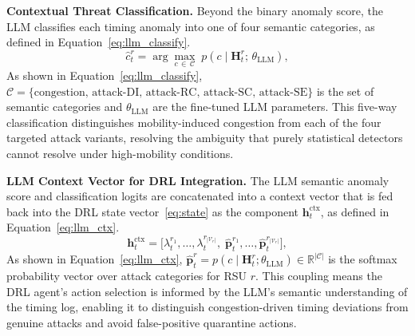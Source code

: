 \textbf{Contextual Threat Classification.}
Beyond the binary anomaly score, the LLM classifies each timing anomaly into one of four
semantic categories, as defined in
Equation~\eqref{eq:llm_classify}.
\begin{equation}
\hat{c}_t^r = \arg\max_{c\,\in\,\mathcal{C}}
  \;p\!\left(c \mid \mathbf{H}_t^r;\,\theta_{\mathrm{LLM}}\right),
\label{eq:llm_classify}
\end{equation}
As shown in Equation~\eqref{eq:llm_classify}, $\mathcal{C} =
\{\mathrm{congestion},\, \mathrm{attack\text{-}DI},\,
\mathrm{attack\text{-}RC},\, \mathrm{attack\text{-}SC},\,
\mathrm{attack\text{-}SE}\}$ is the set of semantic categories
and $\theta_{\mathrm{LLM}}$ are the fine-tuned LLM parameters.
This five-way classification distinguishes mobility-induced
congestion from each of the four targeted attack variants,
resolving the ambiguity that purely statistical detectors
cannot resolve under high-mobility conditions.

\textbf{LLM Context Vector for DRL Integration.}
The LLM semantic anomaly score and classification logits are
concatenated into a context vector that is fed back into the
DRL state vector~\eqref{eq:state} as the component
$\mathbf{h}_t^{\mathrm{ctx}}$, as defined in
Equation~\eqref{eq:llm_ctx}.
\begin{equation}
\mathbf{h}_t^{\mathrm{ctx}} = \bigl[
  \lambda_t^{r_1}, \ldots, \lambda_t^{r_{|\mathcal{V}_r|}},\;
  \hat{\mathbf{p}}_t^{r_1}, \ldots,
  \hat{\mathbf{p}}_t^{r_{|\mathcal{V}_r|}}
\bigr],
\label{eq:llm_ctx}
\end{equation}
As shown in Equation~\eqref{eq:llm_ctx}, $\hat{\mathbf{p}}_t^r
= p(c \mid \mathbf{H}_t^r;\theta_{\mathrm{LLM}}) \in
\mathbb{R}^{|\mathcal{C}|}$ is the softmax probability vector
over attack categories for RSU $r$. This coupling
means the DRL agent's action selection is informed by the
LLM's semantic understanding of the timing log, enabling it
to distinguish congestion-driven timing deviations from
genuine attacks and avoid false-positive quarantine actions.


